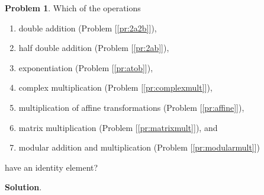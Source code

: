 \documentclass[english,notitlepage,smartquotes]{hgbreport}
\theoremstyle{definition}
\theoremstyle{definition}
\newtheorem{problem}{Problem}
\theoremstyle{remark}
\theoremstyle{plain}
\theoremstyle{definition}
\theoremstyle{definition}
\begin{document}
\begin{problem}
\label{pr:idelem}
Which of the operations
\begin{enumerate}
\item double addition (Problem [\ref{pr:2a2b}]),
\item half double addition (Problem [\ref{pr:2ab}]),
\item exponentiation (Problem [\ref{pr:atob}]),
\item complex multiplication (Problem [\ref{pr:complexmult}]),
\item multiplication of affine transformations (Problem [\ref{pr:affine}]),
\item matrix multiplication (Problem [\ref{pr:matrixmult}]), and
\item modular addition and multiplication (Problem [\ref{pr:modularmult}])
\end{enumerate}
have an identity element?
\end{problem}
\textbf{Solution}.
\end{document}
